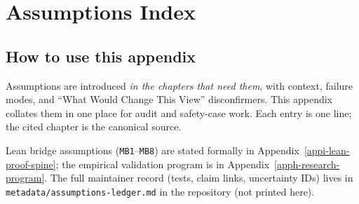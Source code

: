 \chapter{Assumptions Index}
\label{appe-assumptions}

\section{How to use this appendix}

Assumptions are introduced \emph{in the chapters that need them}, with context, failure modes, and ``What Would Change This View'' disconfirmers.
This appendix collates them in one place for audit and safety-case work.
Each entry is one line; the cited chapter is the canonical source.

Lean bridge assumptions (\texttt{MB1}--\texttt{MB8}) are stated formally in Appendix~\ref{appi-lean-proof-spine}; the empirical validation program is in Appendix~\ref{apph-research-program}.
The full maintainer record (tests, claim links, uncertainty IDs) lives in \texttt{metadata/assumptions-ledger.md} in the repository (not printed here).


